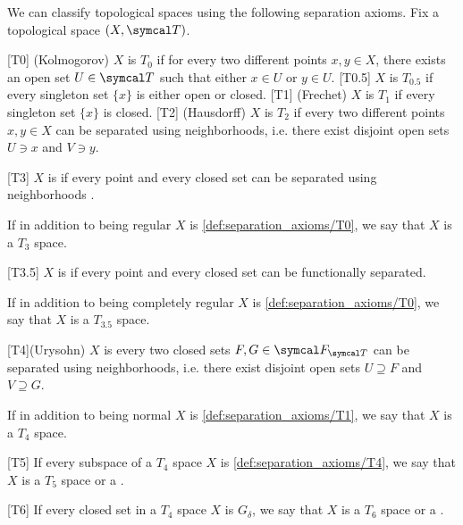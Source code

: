 \begin{definition}\label{def:separation_axioms}
  We can classify topological spaces using the following separation axioms. Fix a topological space \( (X, \Cal{T}) \).

  \begin{description}
    [T0] (Kolmogorov) \( X \) is \( T_0 \) if for every two different points \( x, y \in X \), there exists an open set \( U \in \Cal{T} \) such that either \( x \in U \) or \( y \in U \).
    [T0.5] \( X \) is \( T_{0.5} \) if every singleton set \( \{ x \} \) is either open or closed.
    [T1] (Frechet) \( X \) is \( T_1 \) if every singleton set \( \{ x \} \) is closed.
    [T2] (Hausdorff) \( X \) is \( T_2 \) if every two different points \( x, y \in X \) can be separated using neighborhoods, i.e. there exist disjoint open sets \( U \ni x \) and \( V \ni y \).

    [T3] \( X \) is  if every point and every closed set can be separated using neighborhoods .

    If in addition to being regular \( X \) is \ref{def:separation_axioms/T0}, we say that \( X \) is a \( T_3 \) space.

    [T3.5] \( X \) is  if every point and every closed set can be functionally separated.

    If in addition to being completely regular \( X \) is \ref{def:separation_axioms/T0}, we say that \( X \) is a \( T_{3.5} \) space.

    [T4](Urysohn) \( X \) is  every two closed sets \( F, G \in \Cal{F}_{\Cal{T}} \) can be separated using neighborhoods, i.e. there exist disjoint open sets \( U \supseteq F \) and \( V \supseteq G \).

    If in addition to being normal \( X \) is \ref{def:separation_axioms/T1}, we say that \( X \) is a \( T_4 \) space.

    [T5] If every subspace of a \( T_4 \) space \( X \) is \ref{def:separation_axioms/T4}, we say that \( X \) is a \( T_5 \) space or a .

    [T6] If every closed set in a \( T_4 \) space \( X \) is \( G_\delta \), we say that \( X \) is a \( T_6 \) space or a .
  \end{description}
\end{definition}

